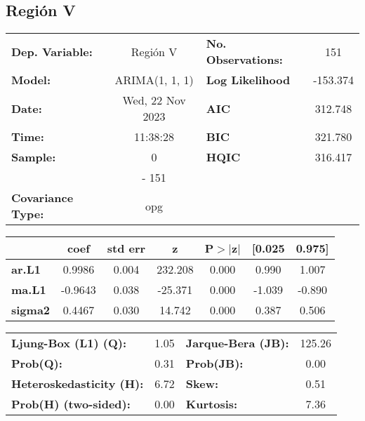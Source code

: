 \documentclass{article}%
\begin{document}
\subsection*{Región V}%
\begin{center}
\begin{tabular}{lclc}
\toprule
\textbf{Dep. Variable:}          &     Región V     & \textbf{  No. Observations:  } &    151      \\
\textbf{Model:}                  &  ARIMA(1, 1, 1)  & \textbf{  Log Likelihood     } &  -153.374   \\
\textbf{Date:}                   & Wed, 22 Nov 2023 & \textbf{  AIC                } &  312.748    \\
\textbf{Time:}                   &     11:38:28     & \textbf{  BIC                } &  321.780    \\
\textbf{Sample:}                 &        0         & \textbf{  HQIC               } &  316.417    \\
\textbf{}                        &       - 151      & \textbf{                     } &             \\
\textbf{Covariance Type:}        &       opg        & \textbf{                     } &             \\
\bottomrule
\end{tabular}
\begin{tabular}{lcccccc}
                & \textbf{coef} & \textbf{std err} & \textbf{z} & \textbf{P$> |$z$|$} & \textbf{[0.025} & \textbf{0.975]}  \\
\midrule
\textbf{ar.L1}  &       0.9986  &        0.004     &   232.208  &         0.000        &        0.990    &        1.007     \\
\textbf{ma.L1}  &      -0.9643  &        0.038     &   -25.371  &         0.000        &       -1.039    &       -0.890     \\
\textbf{sigma2} &       0.4467  &        0.030     &    14.742  &         0.000        &        0.387    &        0.506     \\
\bottomrule
\end{tabular}
\begin{tabular}{lclc}
\textbf{Ljung-Box (L1) (Q):}     & 1.05 & \textbf{  Jarque-Bera (JB):  } & 125.26  \\
\textbf{Prob(Q):}                & 0.31 & \textbf{  Prob(JB):          } &  0.00   \\
\textbf{Heteroskedasticity (H):} & 6.72 & \textbf{  Skew:              } &  0.51   \\
\textbf{Prob(H) (two-sided):}    & 0.00 & \textbf{  Kurtosis:          } &  7.36   \\
\bottomrule
\end{tabular}
\end{center}
\end{document}

